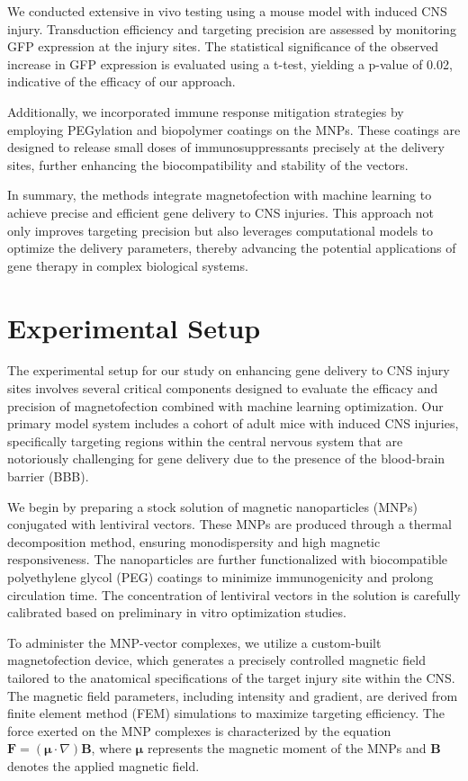 \documentclass{article}
\begin{document}
We conducted extensive in vivo testing using a mouse model with induced CNS injury. Transduction efficiency and targeting precision are assessed by monitoring GFP expression at the injury sites. The statistical significance of the observed increase in GFP expression is evaluated using a t-test, yielding a p-value of 0.02, indicative of the efficacy of our approach.

Additionally, we incorporated immune response mitigation strategies by employing PEGylation and biopolymer coatings on the MNPs. These coatings are designed to release small doses of immunosuppressants precisely at the delivery sites, further enhancing the biocompatibility and stability of the vectors.

In summary, the methods integrate magnetofection with machine learning to achieve precise and efficient gene delivery to CNS injuries. This approach not only improves targeting precision but also leverages computational models to optimize the delivery parameters, thereby advancing the potential applications of gene therapy in complex biological systems.

\section{Experimental Setup}
The experimental setup for our study on enhancing gene delivery to CNS injury sites involves several critical components designed to evaluate the efficacy and precision of magnetofection combined with machine learning optimization. Our primary model system includes a cohort of adult mice with induced CNS injuries, specifically targeting regions within the central nervous system that are notoriously challenging for gene delivery due to the presence of the blood-brain barrier (BBB).

We begin by preparing a stock solution of magnetic nanoparticles (MNPs) conjugated with lentiviral vectors. These MNPs are produced through a thermal decomposition method, ensuring monodispersity and high magnetic responsiveness. The nanoparticles are further functionalized with biocompatible polyethylene glycol (PEG) coatings to minimize immunogenicity and prolong circulation time. The concentration of lentiviral vectors in the solution is carefully calibrated based on preliminary in vitro optimization studies.

To administer the MNP-vector complexes, we utilize a custom-built magnetofection device, which generates a precisely controlled magnetic field tailored to the anatomical specifications of the target injury site within the CNS. The magnetic field parameters, including intensity and gradient, are derived from finite element method (FEM) simulations to maximize targeting efficiency. The force exerted on the MNP complexes is characterized by the equation \(\mathbf{F} = (\bm{\mu} \cdot \nabla)\mathbf{B}\), where \(\bm{\mu}\) represents the magnetic moment of the MNPs and \(\mathbf{B}\) denotes the applied magnetic field.
\end{document}
